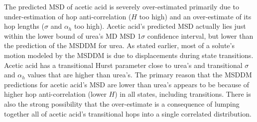 \documentclass[aps,pre,preprint,groupedaddress,longbibliography]{revtex4-2}
\begin{document}
  The predicted MSD of acetic acid is severely over-estimated primarily due to 
  under-estimation of hop anti-correlation ($H$ too high) and an over-estimate of
  its hop lengths ($\sigma$ and $\alpha_h$ too high). Acetic acid's predicted MSD
  actually lies just within the lower bound of urea's MD MSD 1$\sigma$ confidence
  interval, but lower than the prediction of the MSDDM for urea. As stated earlier,
  most of a solute’s motion modeled by the MSDDM is due to displacements during 
  state transitions. Acetic
  acid has a transitional Hurst parameter close to urea’s and transitional $\sigma$
  and $\alpha_h$ values that are higher than urea’s. The primary reason that the MSDDM
  predictions for acetic acid's MSD are lower than urea's appears to be because of
  higher hop anti-correlation (lower $H$) in all states, including transitions. 
  There is also the strong possibility that the over-estimate is a consequence of
  lumping together all of acetic acid’s transitional hops into a single correlated
  distribution.
\end{document}

